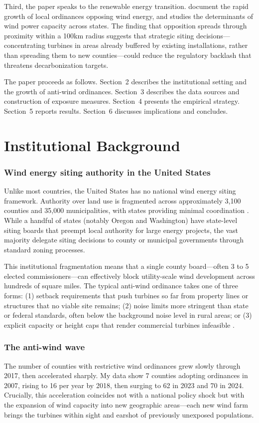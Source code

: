 \documentclass[12pt]{article}
\begin{document}
Third, the paper speaks to the renewable energy transition. \citet{rand2024} document the rapid growth of local ordinances opposing wind energy, and \citet{hitaj2013} studies the determinants of wind power capacity across states. The finding that opposition spreads through proximity within a 100km radius suggests that strategic siting decisions---concentrating turbines in areas already buffered by existing installations, rather than spreading them to new counties---could reduce the regulatory backlash that threatens decarbonization targets.

The paper proceeds as follows. Section~2 describes the institutional setting and the growth of anti-wind ordinances. Section~3 describes the data sources and construction of exposure measures. Section~4 presents the empirical strategy. Section~5 reports results. Section~6 discusses implications and concludes.


\section{Institutional Background}

\subsubsection*{Wind energy siting authority in the United States} Unlike most countries, the United States has no national wind energy siting framework. Authority over land use is fragmented across approximately 3,100 counties and 35,000 municipalities, with states providing minimal coordination \citep{ncsl2024}. While a handful of states (notably Oregon and Washington) have state-level siting boards that preempt local authority for large energy projects, the vast majority delegate siting decisions to county or municipal governments through standard zoning processes.

This institutional fragmentation means that a single county board---often 3 to 5 elected commissioners---can effectively block utility-scale wind development across hundreds of square miles. The typical anti-wind ordinance takes one of three forms: (1) setback requirements that push turbines so far from property lines or structures that no viable site remains; (2) noise limits more stringent than state or federal standards, often below the background noise level in rural areas; or (3) explicit capacity or height caps that render commercial turbines infeasible \citep{nrel2025}.

\subsubsection*{The anti-wind wave} The number of counties with restrictive wind ordinances grew slowly through 2017, then accelerated sharply. My data show 7 counties adopting ordinances in 2007, rising to 16 per year by 2018, then surging to 62 in 2023 and 70 in 2024. Crucially, this acceleration coincides not with a national policy shock but with the expansion of wind capacity into new geographic areas---each new wind farm brings the turbines within sight and earshot of previously unexposed populations.
\end{document}
